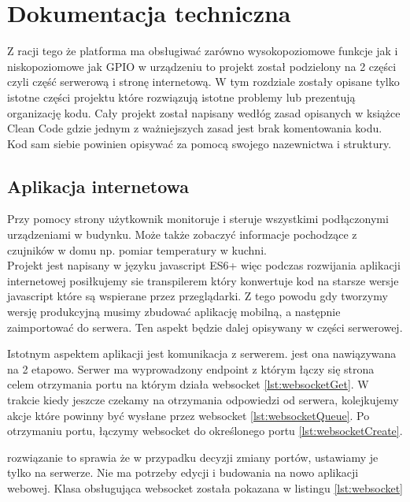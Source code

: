 \chapter{Dokumentacja techniczna}%
Z racji tego że platforma ma obsługiwać zarówno wysokopoziomowe funkcje jak i niskopoziomowe jak GPIO w urządzeniu to projekt został podzielony na 2 części czyli część serwerową i stronę internetową. W tym rozdziale zostały opisane tylko istotne  części projektu które rozwiązują istotne problemy lub prezentują organizację kodu. Cały projekt został napisany wedłóg zasad opisanych w książce Clean Code gdzie jednym z ważniejszych zasad jest brak komentowania kodu. Kod sam siebie powinien opisywać za pomocą swojego nazewnictwa i struktury.  
\section{Aplikacja internetowa}
Przy pomocy strony użytkownik monitoruje i steruje wszystkimi podłączonymi urządzeniami w budynku. Może także zobaczyć informacje pochodzące z czujników w domu np. pomiar temperatury w kuchni. \\
Projekt jest napisany w języku javascript ES6+ więc podczas rozwijania aplikacji internetowej posiłkujemy sie transpilerem który konwertuje kod na starsze wersje javascript które są wspierane przez przeglądarki. Z tego powodu gdy tworzymy wersję produkcyjną musimy zbudować aplikację mobilną, a następnie zaimportować do serwera. Ten aspekt będzie dalej opisywany w części serwerowej.
\par Istotnym aspektem aplikacji jest komunikacja z serwerem. jest ona nawiązywana na 2 etapowo.
Serwer ma wyprowadzony endpoint z którym łączy się strona celem otrzymania portu na którym działa websocket \ref{lst:websocketGet}. W trakcie kiedy jeszcze czekamy na otrzymania odpowiedzi od serwera, kolejkujemy akcje które powinny być wysłane przez websocket \ref{lst:websocketQueue}. Po otrzymaniu portu, łączymy websocket do określonego portu \ref{lst:websocketCreate}. 
\par rozwiązanie to sprawia że w przypadku decyzji zmiany portów, ustawiamy je tylko na serwerze. Nie ma potrzeby edycji i budowania na nowo aplikacji webowej. Klasa obsługująca websocket została pokazana w listingu \ref{lst:websocket}
\newpage

